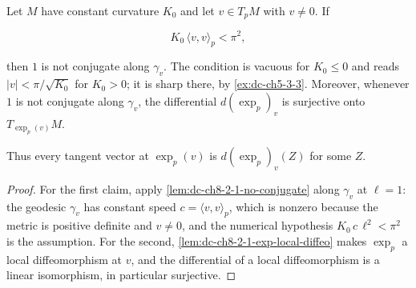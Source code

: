 \begin{lemma}
  \label{lem:dc-ch8-2-1-no-conjugate-ball}


  Let $M$ have constant curvature $K_0$ and let $v\in T_pM$ with $v\neq 0$. If

  $$
  K_0\,\langle v,v\rangle_p<\pi^2 ,
  $$

  then $1$ is not conjugate along $\gamma_v$. The condition is vacuous for $K_0\leq 0$ and reads
  $|v|<\pi/\sqrt{K_0}$ for $K_0>0$; it is sharp there, by \cref{ex:dc-ch5-3-3}. Moreover, whenever
  $1$ is not conjugate along $\gamma_v$, the differential $d(\exp_p)_v$ is surjective onto
  $T_{\exp_p(v)}M$.

  Thus every tangent vector at $\exp_p(v)$ is $d(\exp_p)_v(Z)$ for some $Z$.
\end{lemma}
\begin{proof}

\sketch
  For the first claim, apply \cref{lem:dc-ch8-2-1-no-conjugate} along $\gamma_v$ at $\ell=1$: the
  geodesic $\gamma_v$ has constant speed $c=\langle v,v\rangle_p$, which is nonzero because the
  metric is positive definite and $v\neq 0$, and the numerical hypothesis
  $K_0\,c\,\ell^2<\pi^2$ is the assumption. For the second, \cref{lem:dc-ch8-2-1-exp-local-diffeo}
  makes $\exp_p$ a local diffeomorphism at $v$, and the differential of a local diffeomorphism is
  a linear isomorphism, in particular surjective.
\end{proof}

